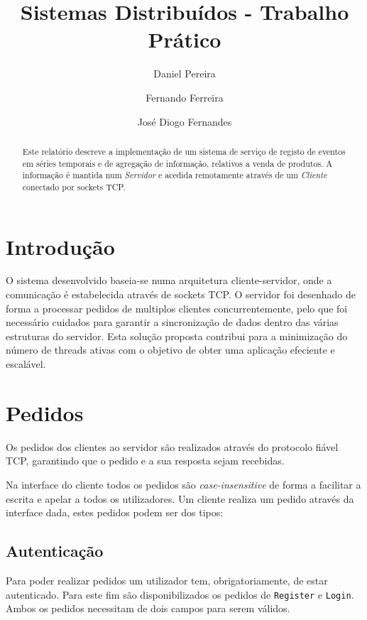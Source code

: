 \documentclass[runningheads]{llncs}
\begin{document}
\title{Sistemas Distribuídos - Trabalho Prático}

\author{Daniel Pereira \and
Fernando Ferreira \and
José Diogo Fernandes}



\maketitle

\begin{abstract}
Este relatório descreve a implementação de um sistema de serviço de registo de eventos em séries temporais e de agregação de informação, relativos a venda de produtos. 
  A informação é mantida num \emph{Servidor} e acedida remotamente através de um \emph{Cliente} conectado por sockets TCP.

\end{abstract}

\section{Introdução}
O sistema desenvolvido baseia-se numa arquitetura cliente-servidor, onde a comunicação é estabelecida através de sockets TCP. O servidor foi desenhado de forma a processar pedidos de multiplos clientes concurrentemente, pelo que foi necessário cuidados para garantir a sincronização de dados dentro das várias estruturas do servidor.
Esta solução proposta contribui para a minimização do número de threads ativas com o objetivo de obter uma aplicação efeciente e escalável.


\section{Pedidos}
Os pedidos dos clientes ao servidor são realizados através do protocolo fiável TCP, garantindo que o pedido e a sua resposta sejam recebidas.

Na interface do cliente todos os pedidos são \emph{case-insensitive} de forma a facilitar a escrita e apelar a todos os utilizadores.
Um cliente realiza um pedido através da interface dada, estes pedidos podem ser dos tipos:

\subsection{Autenticação}
Para poder realizar pedidos um utilizador tem, obrigatoriamente, de estar autenticado. Para este fim são disponibilizados os pedidos de \texttt{Register} e \texttt{Login}.
Ambos os pedidos necessitam de dois campos para serem válidos.
\end{document}

